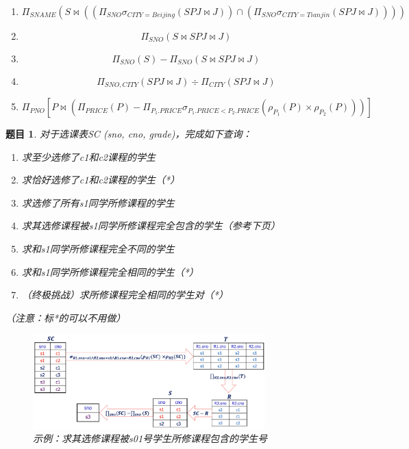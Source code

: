\documentclass[12pt]{article} %
\theoremstyle{problemstyle} %
\newtheorem{problem}{题目} %
\newenvironment{solution}
  {%
    \renewcommand\qedsymbol{$\blacksquare$}%
    \proof[\textit{解答}]\mbox{}\vspace{-4ex}\\%
  }
  {\endproof}
\begin{document}
\begin{solution}

\begin{enumerate}
  \item 
  \[
    \Pi_{SNAME}
    \left(
      S \bowtie
      \left(
      \left(\Pi_{SNO}\sigma_{CITY=Beijing}\left(SPJ \bowtie J\right)\right)
      \cap
      \left(\Pi_{SNO}\sigma_{CITY=Tianjin}\left(SPJ \bowtie J\right)\right)
      \right)
    \right)
  \]
  \item 
  \[
    \Pi_{SNO}
    \left(
      S \bowtie SPJ \bowtie J
    \right)
  \]
  \item 
  \[
    \Pi_{SNO}
    \left(S\right)-
    \Pi_{SNO}
    \left(
      S \bowtie SPJ \bowtie J
    \right)
  \]
  \item 
  \[
    \Pi_{SNO, CITY}\left(SPJ\bowtie J\right)
    \div
    \Pi_{CITY}\left(SPJ\bowtie J\right)
  \]
  \item 
  \[
    \Pi_{PNO}
    \left[
    P\bowtie
    \left(
    \Pi_{PRICE}\left(P\right)-
    \Pi_{P_1.PRICE}\sigma_{P_1.PRICE<P_2.PRICE}\left(\rho_{P_1}(P)\times \rho_{P_2}(P)\right)
    \right)
    \right]
  \]
\end{enumerate}

\end{solution}

\begin{problem}
对于选课表SC (sno, cno, grade)，完成如下查询：

\begin{enumerate}
  \item 求至少选修了c1和c2课程的学生
  \item 求恰好选修了c1和c2课程的学生（*）
  \item 求选修了所有s1同学所修课程的学生
  \item 求其选修课程被s1同学所修课程完全包含的学生（参考下页）
  \item 求和s1同学所修课程完全不同的学生
  \item 求和s1同学所修课程完全相同的学生（*）
  \item （终极挑战）求所修课程完全相同的学生对（*）
\end{enumerate}

（注意：标*的可以不用做）

\begin{figure}[H]
  \centering
  \includegraphics[width=0.8\textwidth]{./figs/2.1.png}
  \caption{示例：求其选修课程被s01号学生所修课程包含的学生号}
\end{figure}

\end{problem}  
\end{document}
